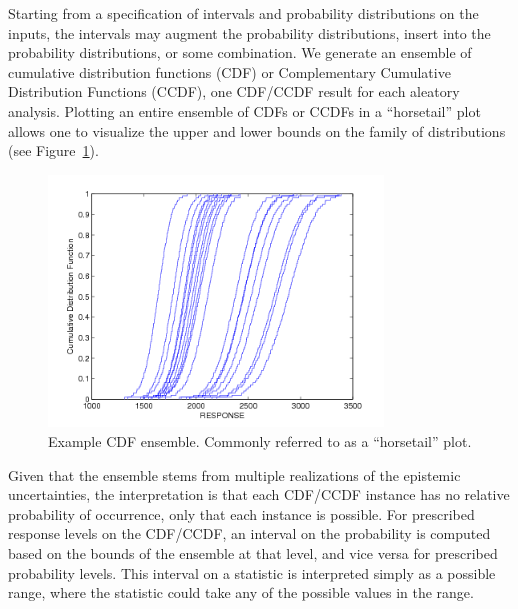 Starting from a specification of intervals and probability distributions 
on the inputs, %
the intervals may augment the probability distributions, insert into
the probability distributions, or some combination.  We generate an
ensemble of cumulative distribution functions (CDF) or Complementary
Cumulative Distribution Functions (CCDF), one CDF/CCDF result for each
aleatory analysis.  Plotting an entire ensemble of CDFs or CCDFs in a 
``horsetail'' plot allows one to visualize the upper and lower bounds 
on the family of distributions (see Figure~\ref{fig:horsetail}).
\begin{figure}[h!]%
 \begin{center}
 \includegraphics[width = 3.5in]{images/horsetail}
 \caption{Example CDF ensemble.  Commonly referred to as a ``horsetail'' plot.}
 \label{fig:horsetail}
 \end{center} 
\end{figure}
Given that the ensemble stems from multiple
realizations of the epistemic uncertainties, the interpretation is
that each CDF/CCDF instance has no relative probability of occurrence,
only that each instance is possible.  For prescribed response levels
on the CDF/CCDF, an interval on the probability is computed based on
the bounds of the ensemble at that level, and vice versa for
prescribed probability levels.  This interval on a statistic is
interpreted simply as a possible range, where the statistic could take
any of the possible values in the range.

